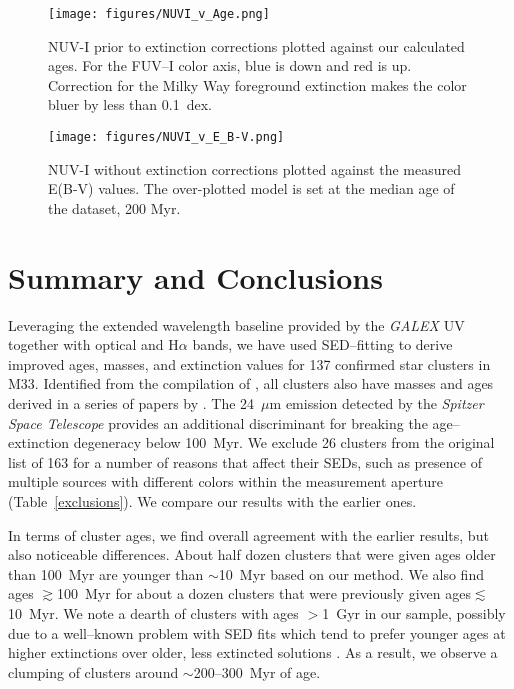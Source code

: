 \documentclass{aastex63}
\begin{document}
\begin{figure}
 \centering
 \texttt{[image: figures/NUVI\_v\_Age.png]}
    \caption{NUV-I prior to extinction corrections plotted against our calculated ages. For the FUV--I color axis, blue is down and red is up. Correction for the Milky Way foreground extinction makes the color bluer by less than 0.1~dex.}
        \label{NUV-I}
\end{figure}

\begin{figure}
 \centering
 \texttt{[image: figures/NUVI\_v\_E\_B-V.png]}
    \caption{NUV-I without extinction corrections plotted against the measured E(B-V) values. The over-plotted model is set at the median age of the dataset, 200 Myr.}
        \label{NUV-I v E(B-V)}
\end{figure}


\section{Summary and Conclusions} \label{sec:conclusions}

Leveraging the extended wavelength baseline provided by the \textit{GALEX} UV together with optical and H$\alpha$ bands, we have used SED--fitting to derive improved ages, masses, and extinction values for 137 confirmed star clusters in M33. Identified from the compilation of \citet{Sarajedini2007}, all clusters also have masses and ages derived in a series of papers by \citet{Ma+2001,  Ma+2002b, Ma+2002c, Ma+2002a, Ma+2004a, Ma+2004b}. The 24~$\mu$m emission detected by the \textit{Spitzer Space Telescope} provides an additional discriminant for breaking the age--extinction degeneracy below 100~Myr. We exclude 26 clusters from the original list of 163 for a number of reasons that affect their SEDs, such as presence of multiple sources with different colors within the measurement aperture (Table~\ref{exclusions}). We compare our results with the earlier ones. 

In terms of cluster ages, we find overall agreement with the earlier results, but also noticeable differences. About half dozen clusters that were given ages older than 100~Myr are younger than $\sim$10~Myr based on our method. We also find ages $\gtrsim$100~Myr for about a dozen clusters that were previously given ages$\lesssim$10~Myr. We note a dearth of clusters with ages $>$1~Gyr in our sample, possibly due to a well--known problem with  SED fits which tend to prefer younger ages at higher extinctions over older, less extincted solutions \citep{Whitmore+2020}. As a result, we observe a clumping of  clusters around $\sim$200--300~Myr of age.
\end{document}
